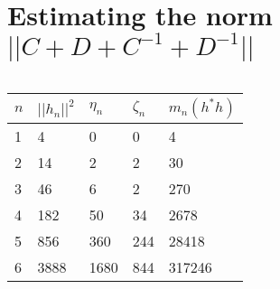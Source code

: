 \documentclass{amsart}
\theoremstyle{definition}
\begin{document}
\section{\textbf{Estimating the norm $||C+D+C^{-1}+D^{-1}||$}}\label{a:normCDCinvDinv}
\begin{sidewaystable} %
\centering
$ $\\$ $\\$ $\\$ $\\$ $\\$ $\\
$ $\\$ $\\$ $\\$ $\\$ $\\$ $\\
$ $\\$ $\\$ $\\$ $\\$ $\\$ $\\
$ $\\$ $\\$ $\\$ $\\$ $\\$ $\\
$ $\\$ $\\$ $\\$ $\\$ $\\$ $\\
$ $\\$ $\\$ $\\$ $\\$ $\\$ $\\
\begin{tabular}{lllll}
\hline
$n$ & $||h_n||^2$ & $\eta_n$ & $\zeta_n$ & $m_n(h^*h)$ \\
\hline
1 & 4 & 0 & 0 & 4 \\
2 & 14 & 2 & 2 & 30 \\
3 & 46 & 6 & 2 & 270 \\
4 & 182 & 50 & 34 & 2678 \\
5 & 856 & 360 & 244 & 28418 \\
6 & 3888 & 1680 & 844 & 317246 \\

\end{tabular}
\end{sidewaystable}
\end{document}
